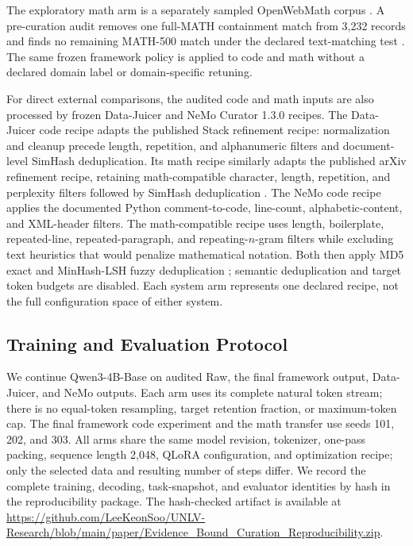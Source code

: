 \documentclass[conference]{IEEEtran}
\begin{document}
The exploratory math arm is a separately sampled OpenWebMath corpus
\cite{paster2023openwebmath}. A pre-curation audit removes one full-MATH
containment match from 3,232 records and finds no remaining MATH-500 match under
the declared text-matching test \cite{cobbe2021gsm8k,hendrycks2021math}. The same
frozen framework policy is applied to code and math without a declared domain
label or domain-specific retuning.

For direct external comparisons, the audited code and math inputs are also
processed by frozen Data-Juicer and NeMo Curator 1.3.0 recipes. The Data-Juicer
code recipe adapts the published Stack refinement recipe: normalization and
cleanup precede length, repetition, and alphanumeric filters and document-level
SimHash deduplication. Its math recipe similarly adapts the published arXiv
refinement recipe, retaining math-compatible character, length, repetition,
and perplexity filters followed by SimHash deduplication
\cite{chen2023datajuicer}. The NeMo code recipe applies the
documented Python comment-to-code, line-count, alphabetic-content, and
XML-header filters. The math-compatible recipe uses length, boilerplate,
repeated-line, repeated-paragraph, and repeating-$n$-gram filters while
excluding text heuristics that would penalize mathematical notation. Both then
apply MD5 exact and MinHash-LSH fuzzy deduplication
\cite{nvidia2026nemo,nvidia2026filtering}; semantic deduplication and target
token budgets are disabled. Each system arm represents one declared recipe,
not the full configuration space of either system.

\subsection{Training and Evaluation Protocol}
We continue Qwen3-4B-Base \cite{yang2025qwen3} on audited Raw, the final
framework output, Data-Juicer, and NeMo outputs.
Each arm uses its complete natural token stream; there is no equal-token
resampling, target retention fraction, or maximum-token cap. The final framework
code experiment and the math transfer use seeds 101, 202, and 303. All arms
share the same model revision, tokenizer, one-pass
packing, sequence length 2,048, QLoRA configuration, and optimization recipe;
only the selected data and resulting number of steps differ. We record the
complete training, decoding, task-snapshot, and evaluator identities by
hash in the reproducibility package.
The hash-checked artifact is available at
\url{https://github.com/LeeKeonSoo/UNLV-Research/blob/main/paper/Evidence_Bound_Curation_Reproducibility.zip}.
\end{document}
